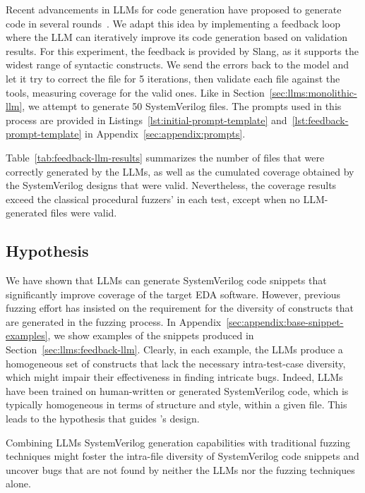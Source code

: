 Recent advancements in LLMs for code generation have proposed to generate code in several rounds~\cite{jiang2024llmfuzz,ossfuzzgen}.
We adapt this idea by implementing a feedback loop where the LLM can iteratively improve its code generation based on validation results.
For this experiment, the feedback is provided by Slang, as it supports the widest range of syntactic constructs.
We send the errors back to the model and let it try to correct the file for 5 iterations, then validate each file against the tools, measuring coverage for the valid ones.
Like in Section~\ref{sec:llms:monolithic-llm}, we attempt to generate 50 SystemVerilog files.
The prompts used in this process are provided in Listings~\ref{lst:initial-prompt-template} and~\ref{lst:feedback-prompt-template} in Appendix~\ref{sec:appendix:prompts}.

Table~\ref{tab:feedback-llm-results} summarizes the number of files that were correctly generated by the LLMs,
as well as the cumulated coverage obtained by the SystemVerilog designs that were valid.
Nevertheless, the coverage results exceed the classical procedural fuzzers' in each test, except when no LLM-generated files were valid.

\subsection{Hypothesis}
\label{sec:llms:lessons}

We have shown that LLMs can generate SystemVerilog code snippets that significantly improve coverage of the target EDA software.
However, previous fuzzing effort has insisted on the requirement for the diversity of constructs that are generated in the fuzzing process.
In Appendix~\ref{sec:appendix:base-snippet-examples}, we show examples of the snippets produced in Section~\ref{sec:llms:feedback-llm}.
Clearly, in each example, the LLMs produce a homogeneous set of constructs that lack the necessary intra-test-case diversity, which might impair their effectiveness in finding intricate bugs.
Indeed, LLMs have been trained on human-written or generated SystemVerilog code, which is typically homogeneous in terms of structure and style, within a given file.
% 
This leads to the hypothesis that guides \ourname's design.

\begin{newhypothesis}
    Combining LLMs SystemVerilog generation capabilities with traditional fuzzing techniques might foster the intra-file diversity of SystemVerilog code snippets and uncover bugs that are not found by neither the LLMs nor the fuzzing techniques alone.
\end{newhypothesis}
